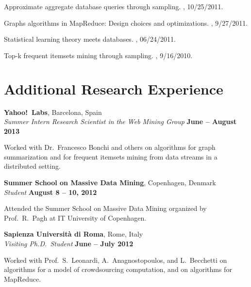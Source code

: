 \documentclass[margin,line]{resume}
\begin{document}
Approximate aggregate database queries through sampling.
, 10/25/2011.

Graphs algorithms in MapReduce: Design choices and optimizations.
, 9/27/2011.

Statistical learning theory meets databases.
, 06/24/2011.

Top-k frequent itemsets mining through sampling.
, 9/16/2010.

\pagebreak
\section{\sc Additional Research Experience}
{\bf Yahoo!~Labs}, Barcelona, Spain \\
{\em Summer Intern Research Scientist in the Web Mining Group} \hfill {\bf June -- August 2013}

\begin{list2}
\vspace*{.05in}
\item Worked with Dr.~Francesco Bonchi and others on algorithms for graph
  summarization and for frequent itemsets mining from data streams in a
  distributed setting.
\end{list2}

{\bf Summer School on Massive Data Mining}, Copenhagen, Denmark \\
{\em Student} \hfill {\bf August 8 -- 10, 2012}

\begin{list2}
  \vspace*{.05in}
\item Attended the Summer School on Massive Data Mining organized by
  Prof.~R.~Pagh at IT University of Copenhagen.
\end{list2}

{\bf Sapienza Universit\`a di Roma}, Rome, Italy\\
{\em Visiting Ph.D.~Student} \hfill {\bf June -- July 2012}

\begin{list2}
\vspace*{.05in}
\item Worked with Prof.~S.~Leonardi, A.~Anagnostopoulos, and L.~Becchetti on
  algorithms for a model of crowdsourcing computation, and on algorithms for
  MapReduce.
\end{list2}
\end{document}
